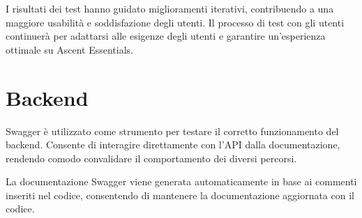   I risultati dei test hanno guidato miglioramenti iterativi, contribuendo a una maggiore usabilità e soddisfazione degli utenti. Il processo di test con gli utenti continuerà per adattarsi alle esigenze degli utenti e garantire un'esperienza ottimale su Ascent Essentials.

\section{Backend}
Swagger è utilizzato come strumento per testare il corretto funzionamento del backend. Consente di interagire direttamente con l'API dalla documentazione, rendendo comodo convalidare il comportamento dei diversi percorsi.

La documentazione Swagger viene generata automaticamente in base ai commenti inseriti nel codice, consentendo di mantenere la documentazione aggiornata con il codice.